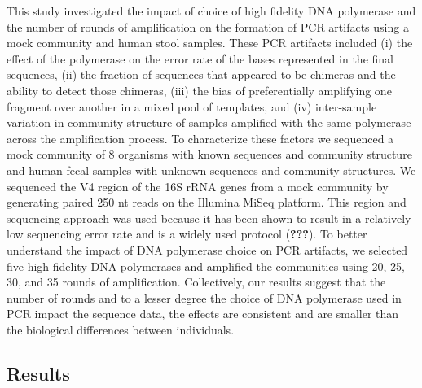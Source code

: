 \documentclass[11pt,]{article}
\begin{document}
This study investigated the impact of choice of high fidelity DNA
polymerase and the number of rounds of amplification on the formation of
PCR artifacts using a mock community and human stool samples. These PCR
artifacts included (i) the effect of the polymerase on the error rate of
the bases represented in the final sequences, (ii) the fraction of
sequences that appeared to be chimeras and the ability to detect those
chimeras, (iii) the bias of preferentially amplifying one fragment over
another in a mixed pool of templates, and (iv) inter-sample variation in
community structure of samples amplified with the same polymerase across
the amplification process. To characterize these factors we sequenced a
mock community of 8 organisms with known sequences and community
structure and human fecal samples with unknown sequences and community
structures. We sequenced the V4 region of the 16S rRNA genes from a mock
community by generating paired 250 nt reads on the Illumina MiSeq
platform. This region and sequencing approach was used because it has
been shown to result in a relatively low sequencing error rate and is a
widely used protocol ({\textbf{???}}). To better understand the impact
of DNA polymerase choice on PCR artifacts, we selected five high
fidelity DNA polymerases and amplified the communities using 20, 25, 30,
and 35 rounds of amplification. Collectively, our results suggest that
the number of rounds and to a lesser degree the choice of DNA polymerase
used in PCR impact the sequence data, the effects are consistent and are
smaller than the biological differences between individuals.

\newpage

\hypertarget{results}{%
\subsection{Results}\label{results}}
\end{document}
